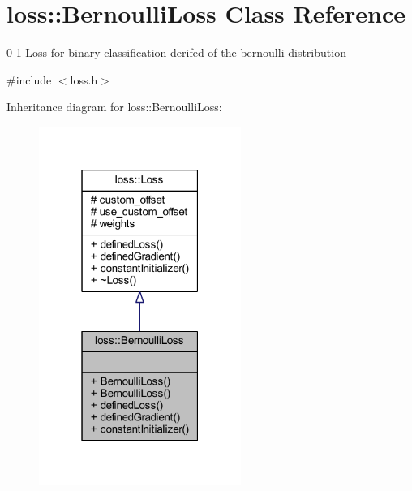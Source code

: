 \hypertarget{classloss_1_1_bernoulli_loss}{}\section{loss\+:\+:Bernoulli\+Loss Class Reference}
\label{classloss_1_1_bernoulli_loss}


0-\/1 \mbox{\hyperlink{classloss_1_1_loss}{Loss}} for binary classification derifed of the bernoulli distribution  




{\ttfamily \#include $<$loss.\+h$>$}



Inheritance diagram for loss\+:\+:Bernoulli\+Loss\+:\nopagebreak
\begin{figure}[H]
\begin{center}
\leavevmode
\includegraphics[width=187pt]{classloss_1_1_bernoulli_loss__inherit__graph}
\end{center}
\end{figure}


